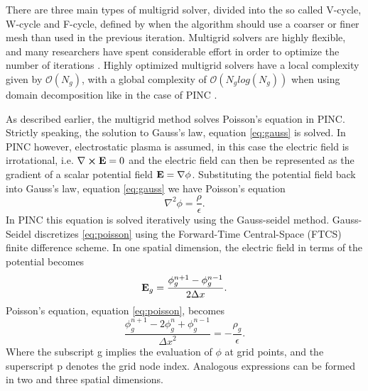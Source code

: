 There are three main types of multigrid solver, divided into the so called V-cycle, W-cycle and F-cycle, defined by when the algorithm should use a coarser or finer mesh than used in the previous iteration. Multigrid solvers are highly flexible, and many researchers have spent considerable effort in order to optimize the number of iterations \parencite{Trottenberg2020}. Highly optimized multigrid solvers have a local complexity given by $\mathcal{O}(N_g)$, with a global complexity of $\mathcal{O}(N_g log(N_g))$ when using domain decomposition like in the case of PINC \parencite{Trottenberg2020}.

As described earlier, the multigrid method solves Poisson's equation in PINC. Strictly speaking, the solution to Gauss's law, equation \eqref{eq:gauss} is solved. In PINC however, electrostatic plasma is assumed, in this case the electric field is irrotational, i.e. $\nabla \cross \vb{E} = 0$ and the electric field can then be represented as the gradient of a scalar potential field $\vb{E} = \nabla \phi$.  Substituting the potential field back into Gauss's law, equation \eqref{eq:gauss} we have Poisson's equation
\begin{equation}\label{eq:poisson}
    \nabla^2 \phi = \frac{\rho}{\epsilon}.
\end{equation}
In PINC this equation is solved iteratively using the Gauss-seidel method. Gauss-Seidel discretizes \eqref{eq:poisson} using the Forward-Time Central-Space (FTCS) finite difference scheme. In one spatial dimension, the electric field in terms of the potential becomes
\begin{equation}\label{eq:Ediscrete}
    \vb{E}_g = \frac{\phi^{n+1}_g - \phi^{n-1}_g}{2\Delta x}.
\end{equation}
Poisson's equation, equation \eqref{eq:poisson}, becomes
\begin{equation}\label{eq:poissonDescrete}
    \frac{\phi^{n+1}_g - 2\phi^n_g + \phi^{n-1}_g}{{\Delta x}^2} = - \frac{\rho_g}{\epsilon}.
\end{equation}
Where the subscript g implies the evaluation of $\phi$ at grid points, and the superscript p denotes the grid node index. Analogous expressions can be formed in two and three spatial dimensions.

